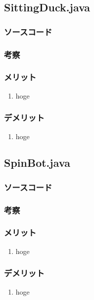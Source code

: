 \documentclass[12pt]{jarticle} %
\begin{document}
\begin{flushleft}
\subsection{SittingDuck.java}
\subsubsection{ソースコード}

\subsubsection{考察}
\subsubsection{メリット}
\begin{enumerate}
\item hoge
\end{enumerate}
\subsubsection{デメリット}
\begin{enumerate}
\item hoge
\end{enumerate}

\subsection{SpinBot.java}
\subsubsection{ソースコード}

\subsubsection{考察}
\subsubsection{メリット}
\begin{enumerate}
\item hoge
\end{enumerate}
\subsubsection{デメリット}
\begin{enumerate}
\item hoge
\end{enumerate}


\end{flushleft}
\end{document}
